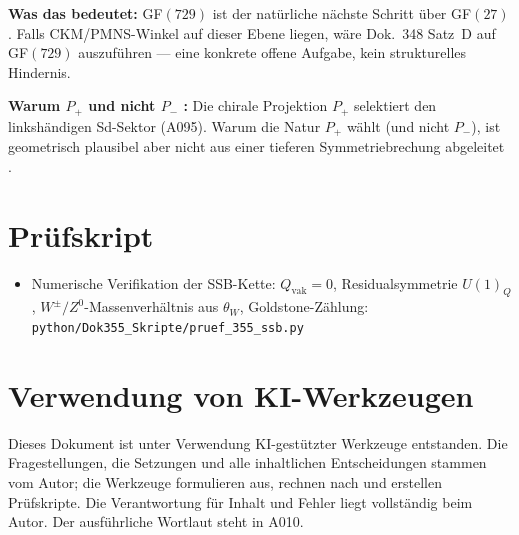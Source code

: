 \textbf{Was das bedeutet:} GF$(729)$ ist der natürliche nächste Schritt
über GF$(27)$. Falls CKM/PMNS-Winkel auf dieser Ebene liegen, wäre
Dok.~348 Satz~D auf GF$(729)$ auszuführen --- eine konkrete offene Aufgabe,
kein strukturelles Hindernis.

\textbf{Warum $P_+$ und nicht $P_-$ \SM:}
Die chirale Projektion $P_+$ selektiert den linkshändigen Sd-Sektor (A095).
Warum die Natur $P_+$ wählt (und nicht $P_-$), ist geometrisch plausibel
aber nicht aus einer tieferen Symmetriebrechung abgeleitet \SM.

\section{Prüfskript}

\begin{itemize}[leftmargin=2em,itemsep=2pt,topsep=2pt]
  \item Numerische Verifikation der SSB-Kette: $Q_\text{vak}=0$,
    Residualsymmetrie $U(1)_Q$, $W^\pm/Z^0$-Massenverhältnis aus $\theta_W$,
    Goldstone-Zählung:
    \texttt{python/Dok355\_Skripte/pruef\_355\_ssb.py}
\end{itemize}

\section{Verwendung von KI-Werkzeugen}

Dieses Dokument ist unter Verwendung KI-gestützter Werkzeuge entstanden.
Die Fragestellungen, die Setzungen und alle inhaltlichen Entscheidungen
stammen vom Autor; die Werkzeuge formulieren aus, rechnen nach und erstellen
Prüfskripte. Die Verantwortung für Inhalt und Fehler liegt vollständig beim
Autor. Der ausführliche Wortlaut steht in A010.
